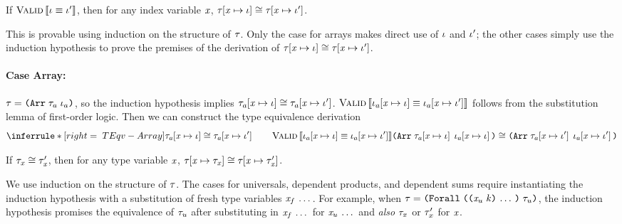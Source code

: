 \begin{lemma}
  \label{EqlIdxEqvType}
  If $\text{\sc Valid} \left\llbracket \mathit{\iota} \equiv \mathit{\iota}' \right\rrbracket$,
  then for any index variable $\mathit{x}$,
  $\mathit{\tau}\hspace{-2pt}\left[ \mathit{x} \mapsto \mathit{\iota} \right] \cong \mathit{\tau}\hspace{-2pt}\left[ \mathit{x} \mapsto \mathit{\iota}' \right]$.
\end{lemma}
\begin{sproof}
  This is provable using induction on the structure of $\mathit{\tau}$.
  Only the case for arrays makes direct use of $\mathit{\iota}$ and $\mathit{\iota}'$;
  the other cases simply use the induction hypothesis
  to prove the premises of the derivation of
  $\mathit{\tau}\hspace{-2pt}\left[ \mathit{x} \mapsto \mathit{\iota} \right] \cong \mathit{\tau}\hspace{-2pt}\left[ \mathit{x} \mapsto \mathit{\iota}' \right]$.
  \paragraph{Case {\sc Array}:}
  $\type = \typearray{\type_a}{\idx_a}$,
  so the induction hypothesis implies $\mathit{\tau}_a\hspace{-2pt}\left[ \mathit{x} \mapsto \mathit{\iota} \right] \cong \mathit{\tau}_a\hspace{-2pt}\left[ \mathit{x} \mapsto \mathit{\iota}' \right]$.
  $\text{\sc Valid} \left\llbracket \mathit{\iota}_a\hspace{-2pt}\left[ \mathit{x} \mapsto \mathit{\iota} \right] \equiv \mathit{\iota}_a\hspace{-2pt}\left[ \mathit{x} \mapsto \mathit{\iota}' \right] \right\rrbracket$
  follows from the substitution lemma of first-order logic.
  Then we can construct the type equivalence derivation
  \[\infr[TEqv-Array]
  {\teqv{\subst{\type_a}{\var}{\idx}}{\subst{\type_a}{\var}{\idx'}}
    \qquad
    \ieqv{\subst{\idx_a}{\var}{\idx}}{\subst{\idx_a}{\var}{\idx'}}}
  {\teqv
    {\typearray{\subst{\type_a}{\var}{\idx}}{\subst{\idx_a}{\var}{\idx}}}
    {\typearray{\subst{\type_a}{\var}{\idx'}}{\subst{\idx_a}{\var}{\idx'}}}}\]
\end{sproof}

\begin{lemma}
  \label{EqlTypeEqvType}
  If $\mathit{\tau}_{\mathit{x}} \cong \mathit{\tau}_{\mathit{x}}'$,
  then for any type variable $\mathit{x}$,
  $\mathit{\tau}\hspace{-2pt}\left[ \mathit{x} \mapsto \mathit{\tau}_{\mathit{x}} \right] \cong \mathit{\tau}\hspace{-2pt}\left[ \mathit{x} \mapsto \mathit{\tau}_{\mathit{x}}' \right]$.
\end{lemma}
\begin{sproof}[\BODY]
  We use induction on the structure of $\mathit{\tau}$.
  The cases for universals, dependent products, and dependent sums
  require instantiating the induction hypothesis 
  with a substitution of fresh type variables $\mathit{x}_f \, \ldots \,$.
  For example, when $\type = \typeuniv{\sequence{\notevar{\var_u}{\kind}}}{\type_u}$,
  the induction hypothesis promises the equivalence of $\mathit{\tau}_u$
  after substituting in $\mathit{x}_f \, \ldots \,$ for $\mathit{x}_u \, \ldots \,$
  and \emph{also} $\mathit{\tau}_x$ or $\mathit{\tau}_x'$ for $\mathit{x}$.
\end{sproof}

